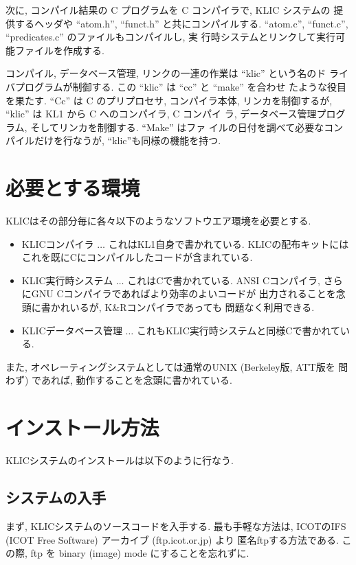 \documentclass[a4,titlepage]{jsreport}
\begin{document}
次に, コンパイル結果の C プログラムを C コンパイラで, KLIC システムの
提供するヘッダや ``atom.h'', ``funct.h'' と共にコンパイルする.
``atom.c'', ``funct.c'', ``predicates.c'' のファイルもコンパイルし, 実
行時システムとリンクして実行可能ファイルを作成する.

コンパイル, データベース管理, リンクの一連の作業は ``klic'' という名のド
ライバプログラムが制御する.  この ``klic'' は ``cc'' と ``make'' を合わせ
たような役目を果たす.  ``Cc'' は C のプリプロセサ, コンパイラ本体, 
リンカを制御するが, ``klic'' は KL1 から C へのコンパイラ, C コンパイ
ラ, データベース管理プログラム, そしてリンカを制御する.  ``Make'' はファ
イルの日付を調べて必要なコンパイルだけを行なうが, ``klic''も同様の機能を持つ.  

\section{必要とする環境}
KLICはその部分毎に各々以下のようなソフトウエア環境を必要とする.  

\begin{itemize}
\item KLICコンパイラ $\ldots$
これはKL1自身で書かれている.
KLICの配布キットにはこれを既にCにコンパイルしたコードが含まれている.

\item KLIC実行時システム $\ldots$
これはCで書かれている.  
ANSI Cコンパイラ, さらにGNU Cコンパイラであればより効率のよいコードが
出力されることを念頭に書かれいるが, K\&Rコンパイラであっても
問題なく利用できる.

\item KLICデータベース管理 $\ldots$
これもKLIC実行時システムと同様Cで書かれている.  

\end{itemize}

また, オペレーティングシステムとしては通常のUNIX (Berkeley版, ATT版を
問わず) であれば, 動作することを念頭に書かれている.  

\section{インストール方法}
KLICシステムのインストールは以下のように行なう.  

\subsection{システムの入手}
まず, KLICシステムのソースコードを入手する.  
最も手軽な方法は, ICOTのIFS (ICOT Free Software) アーカイブ 
(ftp.icot.or.jp) より
匿名ftpする方法である.  
この際, ftp を binary (image) mode にすることを忘れずに.  
\end{document}
